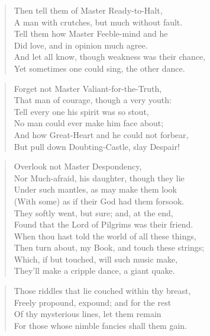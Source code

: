 \begin{verse}
Then tell them of Master Ready-to-Halt,\\
A man with crutches, but much without fault.\\
Tell them how Master Feeble-mind and he\\
Did love, and in opinion much agree.\\
And let all know, though weakness was their chance,\\
Yet sometimes one could sing, the other dance.\\
\end{verse}
\begin{verse}
Forget not Master Valiant-for-the-Truth,\\
That man of courage, though a very youth:\\
Tell every one his spirit was so stout,\\
No man could ever make him face about;\\
And how Great-Heart and he could not forbear,\\
But pull down Doubting-Castle, slay Despair!\\
\end{verse}
\begin{verse}
Overlook not Master Despondency,\\
Nor Much-afraid, his daughter, though they lie\\
Under such mantles, as may make them look\\
(With some) as if their God had them forsook.\\
They softly went, but sure; and, at the end,\\
Found that the Lord of Pilgrims was their friend.\\
When thou hast told the world of all these things,\\
Then turn about, my Book, and touch these strings;\\
Which, if but touched, will such music make,\\
They'll make a cripple dance, a giant quake.\\
\end{verse}
\begin{verse}
Those riddles that lie couched within thy breast,\\
Freely propound, expound; and for the rest\\
Of thy mysterious lines, let them remain\\
For those whose nimble fancies shall them gain.\\
\end{verse}
